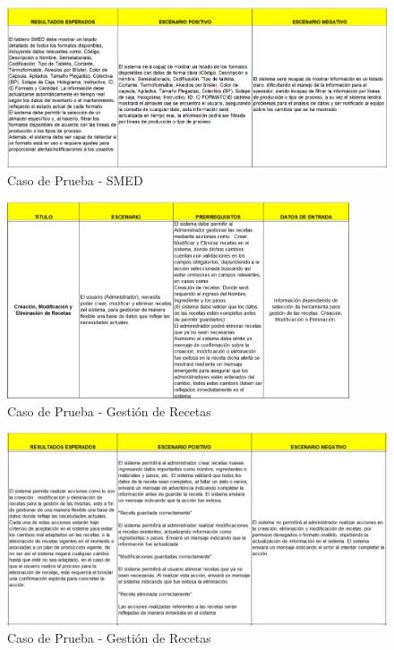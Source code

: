 \documentclass[12pt,letterpaper,spanish, xcolor=table]{report}
\numberwithin{figure}{subsection}
\begin{document}
	\begin{figure}[H]
		\centering
		\includegraphics[width=1.0\textwidth]
		{Imagenes/PathAyuda/CPSMED2.png}
		\caption{Caso de Prueba - SMED
		}\label{a2}
	\end{figure}
	
	\begin{figure}[H]
		\centering
		\includegraphics[width=0.9\textwidth]
		{Imagenes/PathAyuda/CPRecetas.png}
		\caption{Caso de Prueba - Gestión de Recetas
		}\label{a2}
	\end{figure}
	
	\begin{figure}[H]
		\centering
		\includegraphics[width=1.0\textwidth]
		{Imagenes/PathAyuda/CPRecetas2.png}
		\caption{Caso de Prueba - Gestión de Recetas
		}\label{a2}
	\end{figure}
	
\end{document}
